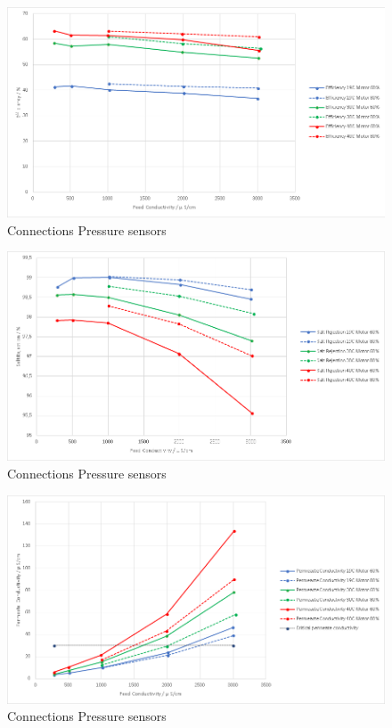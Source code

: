 \begin{figure}[H]
    \centering
    \includegraphics[width=1.1\textwidth]{Efficiency}
    \caption{Connections Pressure sensors}
    \label{fig:PressConn}
\end{figure}

\begin{figure}[H]
    \centering
    \includegraphics[width=1.1\textwidth]{SaltRejection}
    \caption{Connections Pressure sensors}
    \label{fig:PressConn}
\end{figure}

\begin{figure}[H]
    \centering
    \includegraphics[width=1.1\textwidth]{PermCond}
    \caption{Connections Pressure sensors}
    \label{fig:PressConn}
\end{figure}

